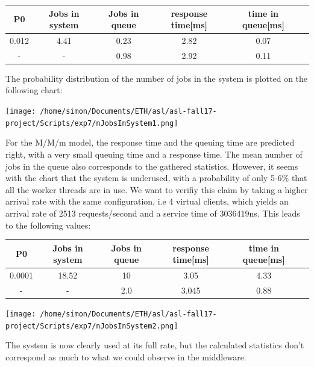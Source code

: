 \documentclass[11pt,a4paper]{article}
\begin{document}
\begin{center}

		\begin{tabular}{|c|c|c|c|c|c|}
			  \hline
			  \textbf{P0} & \textbf{Jobs in system} & \textbf{Jobs in queue} & \textbf{response time[ms]} & \textbf{time in queue[ms]}\\
			  \hline
			  0.012  & 4.41 & 0.23 & 2.82 & 0.07 \\
			   - & - & 0.98  & 2.92 & 0.11 \\
			  \hline
		\end{tabular}
 
\end{center}
The probability distribution of the number of jobs in the system is plotted on the following chart: 
\begin{center} 
\texttt{[image: /home/simon/Documents/ETH/asl/asl-fall17-project/Scripts/exp7/nJobsInSystem1.png]}
\end{center} 
For the M/M/m model, the response time and the queuing time are predicted right, with a very small queuing time and a response time. The mean number of jobs in the queue also corresponds to the gathered statistics. However, it seems with the chart that the system is underused, with a probability of only 5-6\% that all the worker threads are in use. We want to verifiy this claim by taking a higher arrival rate with the same configuration, i.e 4 virtual clients, which yields an arrival rate of 2513 requests/second and a service time of 3036419ns. 
This leads to the following values:
 \begin{center}

		\begin{tabular}{|c|c|c|c|c|c|}
			  \hline
			  \textbf{P0} & \textbf{Jobs in system} & \textbf{Jobs in queue} & \textbf{response time[ms]} & \textbf{time in queue[ms]}\\
			  \hline
			  0.0001  & 18.52 & 10 & 3.05 & 4.33 \\
			  - & - & 2.0  & 3.045 & 0.88 \\
			  \hline
		\end{tabular}
 
\end{center} 
\begin{center} 
\texttt{[image: /home/simon/Documents/ETH/asl/asl-fall17-project/Scripts/exp7/nJobsInSystem2.png]}
\end{center} 
The system is now clearly used at its full rate, but the calculated statistics don't correspond as much to what we could observe in the middleware.
\end{document}
